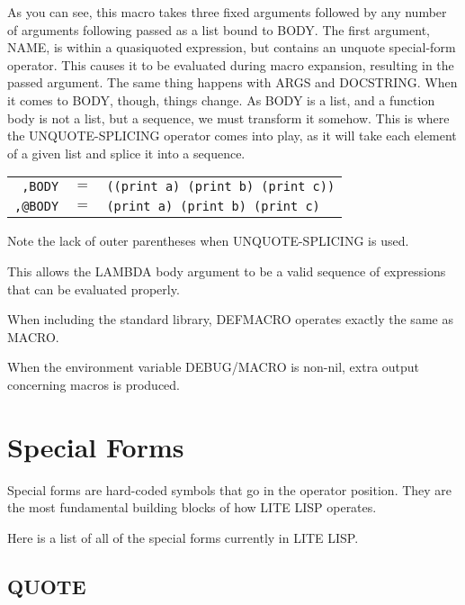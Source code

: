 \documentclass[
letterpaper,
oneside,
]{memoir}
\begin{document}
\noindent
As you can see, this macro takes three fixed arguments followed by any number of arguments following passed as a list bound to BODY. The first argument, NAME, is within a quasiquoted expression, but contains an unquote special-form operator. This causes it to be evaluated during macro expansion, resulting in the passed argument. The same thing happens with ARGS and DOCSTRING. When it comes to BODY, though, things change. As BODY is a list, and a function body is not a list, but a sequence, we must transform it somehow. This is where the UNQUOTE-SPLICING operator comes into play, as it will take each element of a given list and splice it into a sequence.

\begin{center}
  \begin{tabular}{rcl}
    \texttt{,BODY}  & $=$ & \texttt{((print a) (print b) (print c))} \\
    \texttt{,@BODY} & $=$ & \texttt{(print a) (print b) (print c)} \\
  \end{tabular}

  \vspace{1ex}
  {\footnotesize Note the lack of outer parentheses when UNQUOTE-SPLICING is used.}
\end{center}

\filbreak

\noindent
This allows the LAMBDA body argument to be a valid sequence of expressions that can be evaluated properly.

\vspace{1em}
\noindent
When including the standard library, DEFMACRO operates exactly the same as MACRO.

\vspace{1em}
\noindent
When the environment variable DEBUG/MACRO is non-nil, extra output concerning macros is produced.

\chapter{Special Forms}

Special forms are hard-coded symbols that go in the operator position. They are the most fundamental building blocks of how LITE LISP operates.

\vspace{1em}
\noindent
Here is a list of all of the special forms currently in LITE LISP.

\section{QUOTE}
\end{document}
